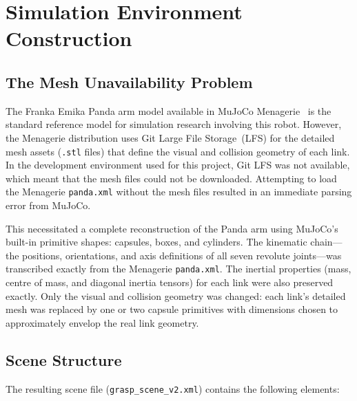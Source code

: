 \documentclass[11pt,a4paper]{report}
\begin{document}
\section{Simulation Environment Construction}
\label{sec:sim_construction}

\subsection{The Mesh Unavailability Problem}

The Franka Emika Panda arm model available in MuJoCo Menagerie~\cite{menagerie2022} is the standard reference model for simulation research involving this robot. However, the Menagerie distribution uses Git Large File Storage~(LFS) for the detailed mesh assets (\texttt{.stl} files) that define the visual and collision geometry of each link. In the development environment used for this project, Git LFS was not available, which meant that the mesh files could not be downloaded. Attempting to load the Menagerie \texttt{panda.xml} without the mesh files resulted in an immediate parsing error from MuJoCo.

This necessitated a complete reconstruction of the Panda arm using MuJoCo's built-in primitive shapes: capsules, boxes, and cylinders. The kinematic chain---the positions, orientations, and axis definitions of all seven revolute joints---was transcribed exactly from the Menagerie \texttt{panda.xml}. The inertial properties (mass, centre of mass, and diagonal inertia tensors) for each link were also preserved exactly. Only the visual and collision geometry was changed: each link's detailed mesh was replaced by one or two capsule primitives with dimensions chosen to approximately envelop the real link geometry.

\subsection{Scene Structure}

The resulting scene file (\texttt{grasp\_scene\_v2.xml}) contains the following elements:
\end{document}
